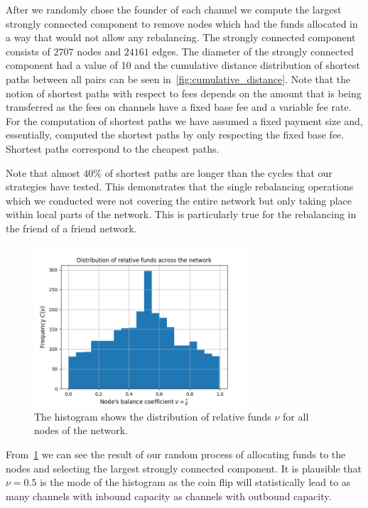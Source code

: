 \documentclass[conference]{IEEEtran}
\begin{document}
After we randomly chose the founder of each channel we compute the largest strongly connected component to remove nodes which had the funds allocated in a way that would not allow any rebalancing.
The strongly connected component consists of $2707$ nodes and $24161$ edges.
The diameter of the strongly connected component had a value of 10 and the cumulative distance distribution of shortest paths between all pairs can be seen in~\cref{fig:cumulative_distance}.
Note that the notion of shortest paths with respect to fees depends on the amount that is being transferred as the fees on channels have a fixed base fee and a variable fee rate.
For the computation of shortest paths we have assumed a fixed payment size and, essentially, computed the shortest paths by only respecting the fixed base fee.
Shortest paths correspond to the cheapest paths.

Note that almost $40\%$ of shortest paths are longer than the cycles that our strategies have tested. 
This demonstrates that the single rebalancing operations which we conducted were not covering the entire network but only taking place within local parts of the network.
This is particularly true for the rebalancing in the friend of a friend network.

\begin{figure}
 \centering
 \includegraphics[width=8cm]{code/vs/fig/distribution_of_nus.png}
 \caption{The histogram shows the distribution of relative funds $\nu$ for all nodes of the network.}
 \label{fig:initial_funds}
\end{figure}
From~\cref{fig:initial_funds} we can see the result of our random process of allocating funds to the nodes and selecting the largest strongly connected component.
It is plausible that $\nu=0.5$ is the mode of the histogram as the coin flip will statistically lead to as many channels with inbound capacity as channels with outbound capacity.
\end{document}
